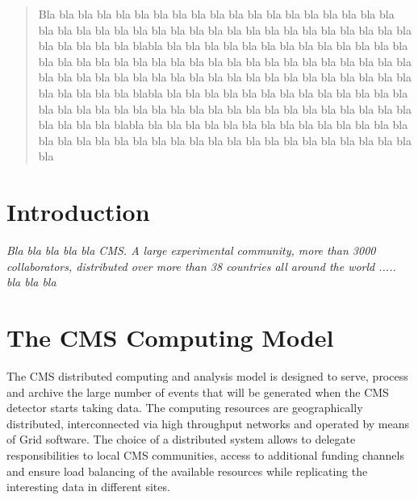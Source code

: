 \date{Received: date / Accepted: date}


\maketitle

\begin{abstract}
Bla bla bla bla bla bla bla bla bla bla bla bla bla bla bla bla bla bla bla bla bla bla bla bla bla bla bla bla bla bla bla bla bla bla bla bla bla bla bla bla bla bla bla bla blabla bla bla bla bla bla bla bla bla bla bla bla bla bla bla bla bla bla bla bla bla bla bla bla bla bla bla bla bla bla bla bla bla bla bla bla bla bla bla bla bla bla bla bla bla bla bla bla bla bla bla bla bla bla bla bla bla bla bla blabla bla bla bla bla bla bla bla bla bla bla bla bla bla bla bla bla bla bla bla bla bla bla bla bla bla bla bla bla bla bla bla bla bla bla bla bla bla blabla bla bla bla bla bla bla bla bla bla bla bla bla bla bla bla bla bla bla bla bla bla bla bla bla bla bla bla bla bla bla bla bla bla bla bla
\end{abstract}

\section{Introduction}
\label{intro}
\emph{Bla bla bla bla bla CMS\cite{RefCMS}.
A large experimental community, more
than 3000 collaborators, distributed over more than 38 countries all around the world ..... bla bla bla}

\section{The CMS Computing Model}
\label{sec:2}
The CMS distributed computing and analysis model is designed to serve, process and archive the %
large number of events that will be generated when the CMS detector starts taking data. The computing resources are geographically distributed, interconnected via high throughput networks and operated by means of Grid software. 
The choice of a distributed system allows to delegate responsibilities to local CMS communities, access to additional funding channels and ensure load balancing of the available resources while replicating the interesting data in different sites.


